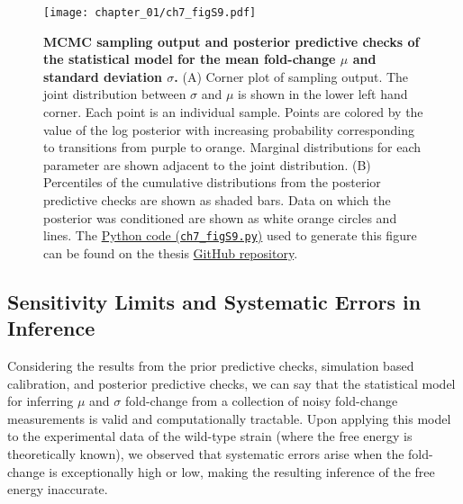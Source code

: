\documentclass[12pt]{caltech_thesis}
\begin{document}
\hypertarget{fig:empirical_F_post_pred}{%
\begin{figure}
\centering
\texttt{[image: chapter\_01/ch7\_figS9.pdf]}
\caption[{MCMC sampling output and posterior predictive checks of the
statistical model for the mean fold-change and standard
deviation.}]{\textbf{MCMC sampling output and posterior predictive
checks of the statistical model for the mean fold-change \(\mu\) and
standard deviation \(\sigma\).} (A) Corner plot of sampling output. The
joint distribution between \(\sigma\) and \(\mu\) is shown in the lower
left hand corner. Each point is an individual sample. Points are colored
by the value of the log posterior with increasing probability
corresponding to transitions from purple to orange. Marginal
distributions for each parameter are shown adjacent to the joint
distribution. (B) Percentiles of the cumulative distributions from the
posterior predictive checks are shown as shaded bars. Data on which the
posterior was conditioned are shown as white orange circles and lines.
The
\href{https://github.com/gchure/phd/blob/master/src/chapter_07/code/ch7_figS9.py}{Python
code (\texttt{ch7\_figS9.py})} used to generate this figure can be found
on the thesis \href{https://github.com/gchure/phd}{GitHub repository}.}
\label{fig:empirical_F_post_pred}
\end{figure}
}

\hypertarget{sensitivity-limits-and-systematic-errors-in-inference}{%
\subsection{Sensitivity Limits and Systematic Errors in
Inference}\label{sensitivity-limits-and-systematic-errors-in-inference}}

Considering the results from the prior predictive checks, simulation
based calibration, and posterior predictive checks, we can say that the
statistical model for inferring \(\mu\) and \(\sigma\) fold-change from
a collection of noisy fold-change measurements is valid and
computationally tractable. Upon applying this model to the experimental
data of the wild-type strain (where the free energy is theoretically
known), we observed that systematic errors arise when the fold-change is
exceptionally high or low, making the resulting inference of the free
energy inaccurate.
\end{document}
